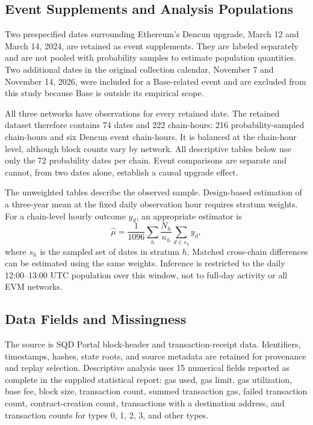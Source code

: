 \documentclass[runningheads]{llncs}
\begin{document}
\subsection{Event Supplements and Analysis Populations}
Two prespecified dates surrounding Ethereum's Dencun upgrade, March 12 and March 14, 2024, are retained as event supplements. They are labeled separately and are not pooled with probability samples to estimate population quantities. Two additional dates in the original collection calendar, November 7 and November 14, 2026, were included for a Base-related event and are excluded from this study because Base is outside its empirical scope.

All three networks have observations for every retained date. The retained dataset therefore contains 74 dates and 222 chain-hours: 216 probability-sampled chain-hours and six Dencun event chain-hours. It is balanced at the chain-hour level, although block counts vary by network. All descriptive tables below use only the 72 probability dates per chain. Event comparisons are separate and cannot, from two dates alone, establish a causal upgrade effect.

The unweighted tables describe the observed sample. Design-based estimation of a three-year mean at the fixed daily observation hour requires stratum weights. For a chain-level hourly outcome $y_d$, an appropriate estimator is
\begin{equation}
\widehat{\mu}=\frac{1}{1096}\sum_h\frac{N_h}{n_h}\sum_{d\in s_h}y_d,
\end{equation}
where $s_h$ is the sampled set of dates in stratum $h$. Matched cross-chain differences can be estimated using the same weights. Inference is restricted to the daily 12:00--13:00 UTC population over this window, not to full-day activity or all EVM networks.

\subsection{Data Fields and Missingness}
The source is SQD Portal block-header and transaction-receipt data. Identifiers, timestamps, hashes, state roots, and source metadata are retained for provenance and replay selection. Descriptive analysis uses 15 numerical fields reported as complete in the supplied statistical report: gas used, gas limit, gas utilization, base fee, block size, transaction count, summed transaction gas, failed transaction count, contract-creation count, transactions with a destination address, and transaction counts for types 0, 1, 2, 3, and other types.
\end{document}
